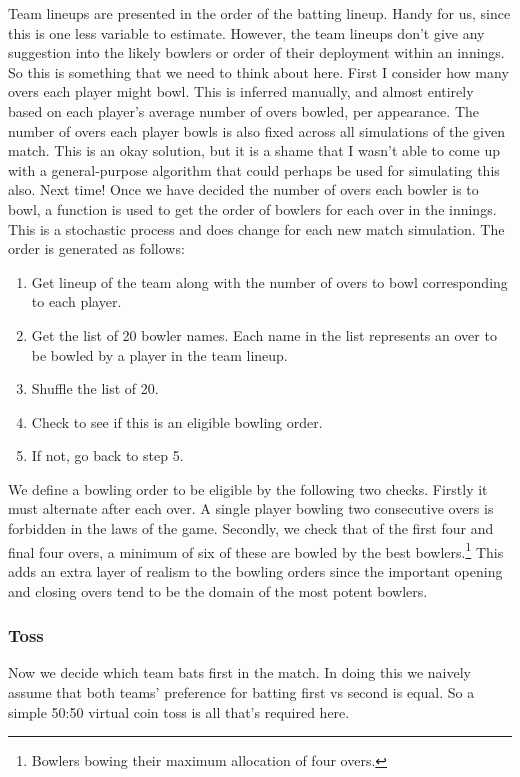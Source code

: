 Team lineups are presented in the order of the batting lineup. Handy for us, since this is one less variable to estimate. However, the team lineups don't give any suggestion into the likely bowlers or order of their deployment within an innings. So this is something that we need to think about here. First I consider how many overs each player might bowl. This is inferred manually, and almost entirely based on each player's average number of overs bowled, per appearance. The number of overs each player bowls is also fixed across all simulations of the given match. This is an okay solution, but it is a shame that I wasn't able to come up with a general-purpose algorithm that could perhaps be used for simulating this also. Next time! Once we have decided the number of overs each bowler is to bowl, a function is used to get the order of bowlers for each over in the innings. This is a stochastic process and does change for each new match simulation. The order is generated as follows:

\begin{enumerate}
    \itemsep-0.25em
    \item Get lineup of the team along with the number of overs to bowl corresponding to each player.
    \item Get the list of 20 bowler names. Each name in the list represents an over to be bowled by a player in the team lineup.
    \item Shuffle the list of 20.
    \item Check to see if this is an eligible bowling order.
    \item If not, go back to step 5.
\end{enumerate}

We define a bowling order to be eligible by the following two checks. Firstly it must alternate after each over. A single player bowling two consecutive overs is forbidden in the laws of the game. Secondly, we check that of the first four and final four overs, a minimum of six of these are bowled by the best bowlers.\footnote{Bowlers bowing their maximum allocation of four overs.} This adds an extra layer of realism to the bowling orders since the important opening and closing overs tend to be the domain of the most potent bowlers.

\subsubsection{Toss}

Now we decide which team bats first in the match. In doing this we naively assume that both teams' preference for batting first vs second is equal. So a simple 50:50 virtual coin toss is all that's required here.

